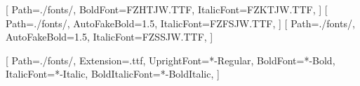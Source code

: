 \let\oldmarginpar\marginpar
\renewcommand{\marginpar}[1]{\oldmarginpar{\footnotesize #1}}


\usepackage{fancyhdr} %
\usepackage{lastpage} %
\setlength{\headheight}{13pt} %

\makeatletter
\let\oldauthor\author
\renewcommand{\author}[1]{\oldauthor{#1}\def\myauthor{#1}}
\let\olddate\date
\renewcommand{\date}[1]{\olddate{#1}\def\mydate{#1}}
\makeatother

\pagestyle{fancy} %
\fancyhf{} %

\fancyhead[L]{\myauthor} %
\fancyhead[R]{\mydate} %

\cfoot{\thepage\ / \pageref*{LastPage}} %


\usepackage[T1]{fontenc} %
\usepackage{anyfontsize}
\usepackage{lmodern} %
\usepackage{libertine} %

[ %
    Path=./fonts/,
    BoldFont=FZHTJW.TTF, %
    ItalicFont=FZKTJW.TTF, %
]
[ %
    Path=./fonts/,
    AutoFakeBold=1.5,  %
    ItalicFont=FZFSJW.TTF, %
]
[ %
    Path=./fonts/,
    AutoFakeBold=1.5,  %
    ItalicFont=FZSSJW.TTF, %
] 

\setmonofont{MapleMono-NF-CN}[ %
    Path=./fonts/, %
    Extension=.ttf, %
    UprightFont=*-Regular, %
    BoldFont=*-Bold, %
    ItalicFont=*-Italic, %
    BoldItalicFont=*-BoldItalic, %
]

